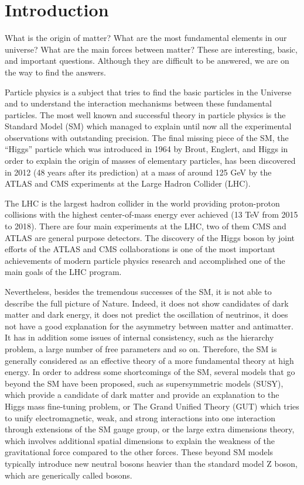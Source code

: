 \chapter*{Introduction}

What is the origin of matter? What are the most fundamental elements in our universe? What are the main forces between matter?
These are interesting, basic, and important questions. Although they are difficult to be answered, we are on the way to find the answers.

Particle physics is a subject that tries to find the basic particles in the Universe and to understand the interaction mechanisms between these fundamental particles. The most well known and successful theory in particle physics is the Standard Model (SM) which managed to explain until now all the experimental observations with outstanding precision. The final missing piece of the SM, the ``Higgs'' particle which was introduced in 1964 by Brout, Englert, and Higgs in order to explain the origin of masses of elementary particles, has been discovered in 2012 (48 years after its prediction) at a mass of around 125 GeV by the ATLAS and CMS experiments at the Large Hadron Collider (LHC).

The LHC is the largest hadron collider in the world providing proton-proton collisions with the highest center-of-mass energy ever achieved (13 TeV from 2015 to 2018). There are four main experiments at the LHC, two of them CMS and ATLAS are general purpose detectors. The discovery of the Higgs boson by joint efforts of the ATLAS and CMS collaborations is one of the most important achievements of modern particle physics research and accomplished one of the main goals of the LHC program.

Nevertheless, besides the tremendous successes of the SM, it is not able to describe the full picture of Nature. Indeed, it does not show candidates of dark matter and dark energy, it does not predict the oscillation of neutrinos, it does not have a good explanation for the asymmetry between matter and antimatter. It has in addition some issues of internal consistency, such as the hierarchy problem, a large number of free parameters and so on. Therefore, the SM is generally considered as an effective theory of a more fundamental theory at high energy. In order to address some shortcomings of the SM, several models that go beyond the SM have been proposed, such as supersymmetric models (SUSY), which provide a candidate of dark matter and provide an explanation to the Higgs mass fine-tuning problem, or The Grand Unified Theory (GUT) which tries to unify electromagnetic, weak, and strong interactions into one interaction through extensions of the SM gauge group, or the large extra dimensions theory, which involves additional spatial dimensions to explain the weakness of the gravitational force compared to the other forces. These beyond SM models typically introduce new neutral bosons heavier than the standard model Z boson, which are generically called \ZP bosons.

